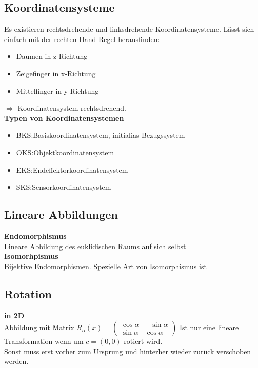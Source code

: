 \subsection{Koordinatensysteme}%
\label{math:sub:koordinatensysteme}
Es existieren rechtsdrehende und linksdrehende Koordinatensysteme. Lässt sich einfach mit der rechten-Hand-Regel herausfinden:
\begin{itemize}
  \item Daumen in z-Richtung
  \item Zeigefinger in x-Richtung
  \item Mittelfinger in y-Richtung
\end{itemize}
\(\Rightarrow\) Koordinatensystem rechtsdrehend.\\

\textbf{Typen von Koordinatensystemen}
\begin{itemize}
  \item BKS:\@ Basiskoordinatensystem, initialias Bezugssystem
  \item OKS:\@ Objektkoordinatensystem
  \item EKS:\@ Endeffektorkoordinatensystem
  \item SKS:\@ Sensorkoordinatensystem
\end{itemize}

\subsection{Lineare Abbildungen}%
\label{math:sub:lineare-abbildungen}
\textbf{Endomorphismus}\\
Lineare Abbildung des euklidischen Raums auf sich selbst\\

\textbf{Isomorhpismus}\\
Bijektive Endomorphismen. Spezielle Art von Isomorphismus ist \SO{}

\subsection{Rotation}%
\label{math:sub:rotation}
\textbf{in 2D}\\
Abbildung mit Matrix \(R_\alpha(x) = \begin{pmatrix} \cos \alpha & -\sin\alpha \\ \sin \alpha & \cos \alpha\end{pmatrix}\)
Ist nur eine lineare Transformation wenn um \(c=(0,0)\) rotiert wird.\\
Sonst muss erst vorher zum Ursprung und hinterher wieder zurück verschoben werden.\\

